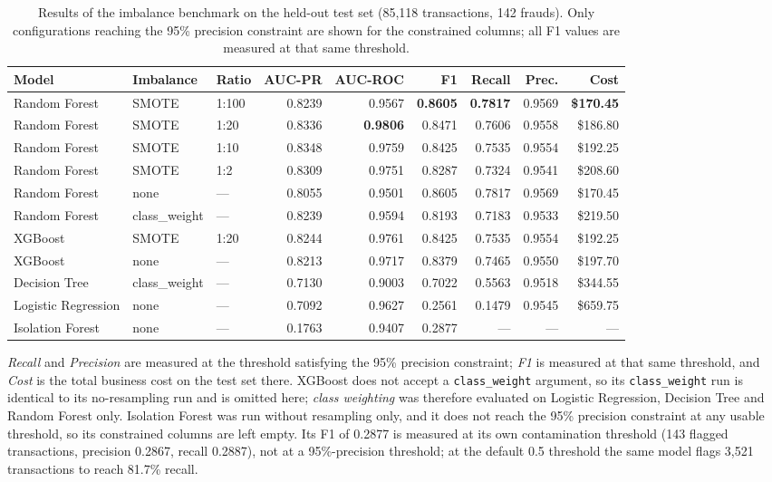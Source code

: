 \begin{table}[h!]
\centering
\caption{Results of the imbalance benchmark on the held-out test set
(85{,}118 transactions, 142 frauds). Only configurations reaching the 95\%
precision constraint are shown for the constrained columns; all F1 values are
measured at that same threshold.}
\label{tab:bench}
\scriptsize
\setlength{\tabcolsep}{2.2pt}
\begin{tabular}{p{1.9cm}p{1.7cm}p{0.85cm}rrrrrr}
\toprule
\textbf{Model} & \textbf{Imbalance} & \textbf{Ratio} & \textbf{AUC-PR} & \textbf{AUC-ROC} & \textbf{F1} & \textbf{Recall} & \textbf{Prec.} & \textbf{Cost} \\
\midrule
Random Forest & SMOTE & 1:100 & 0.8239 & 0.9567 & \textbf{0.8605} & \textbf{0.7817} & 0.9569 & \textbf{\$170.45} \\
Random Forest & SMOTE & 1:20 & 0.8336 & \textbf{0.9806} & 0.8471 & 0.7606 & 0.9558 & \$186.80 \\
Random Forest & SMOTE & 1:10 & 0.8348 & 0.9759 & 0.8425 & 0.7535 & 0.9554 & \$192.25 \\
Random Forest & SMOTE & 1:2 & 0.8309 & 0.9751 & 0.8287 & 0.7324 & 0.9541 & \$208.60 \\
Random Forest & none & --- & 0.8055 & 0.9501 & 0.8605 & 0.7817 & 0.9569 & \$170.45 \\
Random Forest & class\_weight & --- & 0.8239 & 0.9594 & 0.8193 & 0.7183 & 0.9533 & \$219.50 \\
XGBoost & SMOTE & 1:20 & 0.8244 & 0.9761 & 0.8425 & 0.7535 & 0.9554 & \$192.25 \\
XGBoost & none & --- & 0.8213 & 0.9717 & 0.8379 & 0.7465 & 0.9550 & \$197.70 \\
Decision Tree & class\_weight & --- & 0.7130 & 0.9003 & 0.7022 & 0.5563 & 0.9518 & \$344.55 \\
Logistic Regression & none & --- & 0.7092 & 0.9627 & 0.2561 & 0.1479 & 0.9545 & \$659.75 \\
\midrule
Isolation Forest & none & --- & 0.1763 & 0.9407 & 0.2877 & --- & --- & --- \\
\bottomrule
\bottomrule
\end{tabular}

\vspace{2pt}
\footnotesize
\textit{Recall} and \textit{Precision} are measured at the threshold
satisfying the 95\% precision constraint; \textit{F1} is measured at that
same threshold, and \textit{Cost} is the total business cost on the test set
there. XGBoost does not accept a \texttt{class\_weight} argument, so its
\texttt{class\_weight} run is identical to its no-resampling run and is
omitted here; \emph{class weighting} was therefore evaluated on Logistic
Regression, Decision Tree and Random Forest only. Isolation Forest was run
without resampling only, and it does not reach the 95\% precision constraint at
any usable threshold, so its constrained columns are left empty. Its F1 of
0.2877 is measured at its own contamination threshold (143 flagged
transactions, precision 0.2867, recall 0.2887), not at a 95\%-precision
threshold; at the default 0.5 threshold the same model flags 3{,}521
transactions to reach 81.7\% recall.
\end{table}

